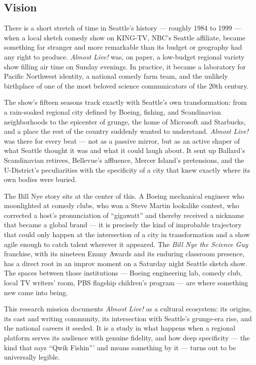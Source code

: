 \documentclass[11pt,letterpaper]{article}
\begin{document}
\subsection{Vision}

There is a short stretch of time in Seattle's history --- roughly 1984 to 1999 --- when a local sketch comedy show on KING-TV, NBC's Seattle affiliate, became something far stranger and more remarkable than its budget or geography had any right to produce. \textit{Almost Live!} was, on paper, a low-budget regional variety show filling air time on Sunday evenings. In practice, it became a laboratory for Pacific Northwest identity, a national comedy farm team, and the unlikely birthplace of one of the most beloved science communicators of the 20th century.

The show's fifteen seasons track exactly with Seattle's own transformation: from a rain-soaked regional city defined by Boeing, fishing, and Scandinavian neighborhoods to the epicenter of grunge, the home of Microsoft and Starbucks, and a place the rest of the country suddenly wanted to understand. \textit{Almost Live!} was there for every beat --- not as a passive mirror, but as an active shaper of what Seattle thought it was and what it could laugh about. It sent up Ballard's Scandinavian retirees, Bellevue's affluence, Mercer Island's pretensions, and the U-District's peculiarities with the specificity of a city that knew exactly where its own bodies were buried.

The Bill Nye story sits at the center of this. A Boeing mechanical engineer who moonlighted at comedy clubs, who won a Steve Martin lookalike contest, who corrected a host's pronunciation of ``gigawatt'' and thereby received a nickname that became a global brand --- it is precisely the kind of improbable trajectory that could only happen at the intersection of a city in transformation and a show agile enough to catch talent wherever it appeared. The \textit{Bill Nye the Science Guy} franchise, with its nineteen Emmy Awards and its enduring classroom presence, has a direct root in an improv moment on a Saturday night Seattle sketch show. The spaces between those institutions --- Boeing engineering lab, comedy club, local TV writers' room, PBS flagship children's program --- are where something new came into being.

This research mission documents \textit{Almost Live!} as a cultural ecosystem: its origins, its cast and writing community, its intersection with Seattle's grunge-era rise, and the national careers it seeded. It is a study in what happens when a regional platform serves its audience with genuine fidelity, and how deep specificity --- the kind that says ``Qwik Fishin''' and means something by it --- turns out to be universally legible.
\end{document}

